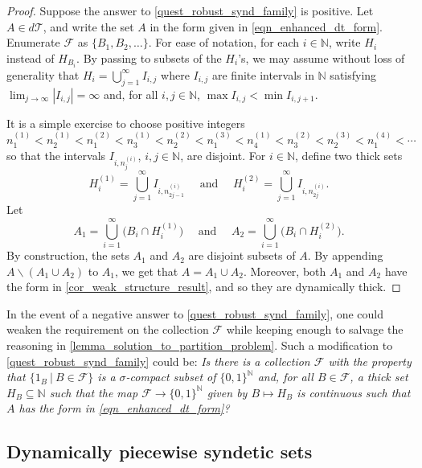 \documentclass[letter,11pt]{article}
\theoremstyle{plain}
\theoremstyle{definition}
\theoremstyle{plain}
\theoremstyle{plain}
\numberwithin{equation}{section}
\newcommand{\N}{\mathbb{N}}
\renewcommand{\setminus}{\backslash}
\newcommand{\dthick}{d\mathcal{T}}
\newcommand{\family}{\mathscr{F}}
\begin{document}
\begin{proof}
    Suppose the answer to \cref{quest_robust_synd_family} is positive.  Let $A \in \dthick$, and write the set $A$ in the form given in \eqref{eqn_enhanced_dt_form}. Enumerate $\family$ as $\{B_1, B_2, \ldots\}$. For ease of notation, for each $i \in \N$, write $H_i$ instead of $H_{B_i}$. By passing to subsets of the $H_i$'s, we may assume without loss of generality that $H_i = \bigcup_{j=1}^{\infty} I_{i, j}$ where $I_{i,j}$ are finite intervals in $\N$ satisfying $\lim_{j \to \infty} |I_{i,j}| = \infty$ and, for all $i, j \in \N$, $\max I_{i,j} < \min I_{i, j+1}$.

    It is a simple exercise to choose positive integers
    \[n^{(1)}_1 < n^{(1)}_2 < n^{(2)}_1 < n^{(1)}_3 < n^{(2)}_2 < n^{(3)}_1 < n^{(1)}_4 < n^{(2)}_3 < n^{(3)}_2 < n^{(4)}_1 < \cdots\]
    so that the intervals $I_{i, n^{(i)}_j}$, $i, j \in \N$, are disjoint.  For $i \in \N$, define two thick sets
    \[
        H^{(1)}_i = \bigcup_{j=1}^{\infty} I_{i, n^{(i)}_{2j-1}} \quad \text{ and } \quad  H^{(2)}_i = \bigcup_{j=1}^{\infty} I_{i, n^{(i)}_{2j}}.
    \]
    Let
    \[  
        A_1 = \bigcup_{i=1}^{\infty}  \big(B_i \cap H^{(1)}_i \big) \quad \text{ and } \quad A_2 = \bigcup_{i=1}^{\infty}  \big(B_i \cap H^{(2)}_i \big).
    \]
    By construction, the sets $A_1$ and $A_2$ are disjoint subsets of $A$.  By appending $A \setminus (A_1 \cup A_2)$ to $A_1$, we get that $A = A_1 \cup A_2$.  Moreover, both $A_1$ and $A_2$ have the form in \cref{cor_weak_structure_result}, and so they are dynamically thick.
\end{proof}


In the event of a negative answer to \cref{quest_robust_synd_family}, one could weaken the requirement on the collection $\family$ while keeping enough to salvage the reasoning in \cref{lemma_solution_to_partition_problem}.  Such a modification to \cref{quest_robust_synd_family} could be: \emph{Is there is a collection $\family$ with the property that $\{ 1_B \ | \ B \in \family\}$ is a $\sigma$-compact subset of $\{0,1\}^{\N}$ and, for all $B \in \family$, a thick set $H_B \subseteq \N$ such that the map $\family \to \{0,1\}^{\N}$ given by $B \mapsto H_B$ is continuous such that $A$ has the form in \eqref{eqn_enhanced_dt_form}?}



\subsection{Dynamically piecewise syndetic sets}
\label{sec_open_quests_dps_sets}
\end{document}
